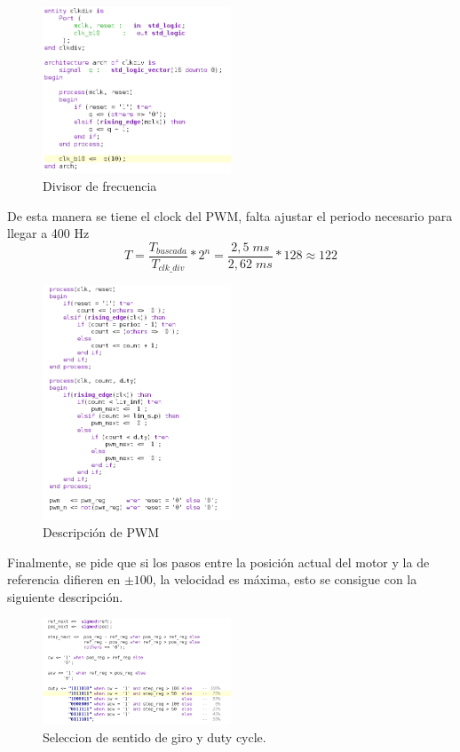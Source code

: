 \documentclass[11pt, a4paper]{article}
\begin{document}
		\begin{figure}[H]
			\centering
			\includegraphics[width=0.5\textwidth]{Imagenes/clk_div.png}
			\caption{Divisor de frecuencia}
			\label{fig:clk_div}
		\end{figure} 

		De esta manera se tiene el clock del PWM, falta ajustar el periodo necesario para llegar a 400 Hz
			\begin{equation}
				T = \frac{T_{buscada}}{T_{clk\_div}} * 2^n = \frac{2,5 \; ms}{2,62 \; ms} * 128 \approx 122 
			\end{equation}

		\begin{figure}[H]
			\centering
			\includegraphics[width=0.5\textwidth]{Imagenes/pwm_400.png}
			\caption{Descripción de PWM}
			\label{fig:pwm_400}
		\end{figure} 

		Finalmente, se pide que si los pasos entre la posición actual del motor y la de referencia difieren en $\pm 100$, la velocidad es máxima, esto se consigue con la siguiente descripción.

		\begin{figure}[H]
			\centering
			\includegraphics[width=0.5\textwidth]{Imagenes/func_pwm.png}
			\caption{Seleccion de sentido de giro y duty cycle.}
			\label{fig:func_pwm}
		\end{figure} 
\end{document}
